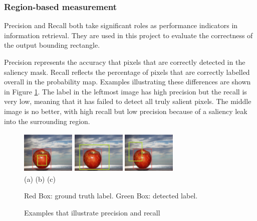\documentclass[10pt,twocolumn,letterpaper]{article}
\newcommand{\hs}{\hspace{0.58in}}
\begin{document}
\subsubsection{Region-based measurement}
Precision and Recall both take significant roles as performance indicators in information retrieval.  They are used in this project to evaluate the correctness of the output bounding rectangle.

Precision represents the accuracy that pixels that are correctly detected in the saliency mask. Recall reflects the percentage of pixels that are correctly labelled overall in the probability map.  Examples illustrating these differences are shown in Figure \ref{Fig:PrecisionANDRecall}. The label in the leftmost image has high precision but the recall is very low, meaning that it has failed to detect all truly salient pixels.  The middle image is no better, with high recall but low precision because of a saliency leak into the surrounding region.

\begin{figure}[h]
\begin{center}
    \includegraphics[width=1.0in,height=0.8in]{Figures/Creteria/B.jpg}
    \includegraphics[width=1.0in,height=0.8in]{Figures/Creteria/C.jpg} 
    \includegraphics[width=1.0in,height=0.8in]{Figures/Creteria/A.jpg} \\
    \footnotesize (a) \hs \hspace*{0.8cm} (b)  \hs \hspace*{0.8cm} (c)
    \caption{Examples that illustrate precision and recall} \label{Fig:PrecisionANDRecall}
    Red Box: ground truth label. Green Box: detected label.
\end{center} \end{figure}
\end{document}
